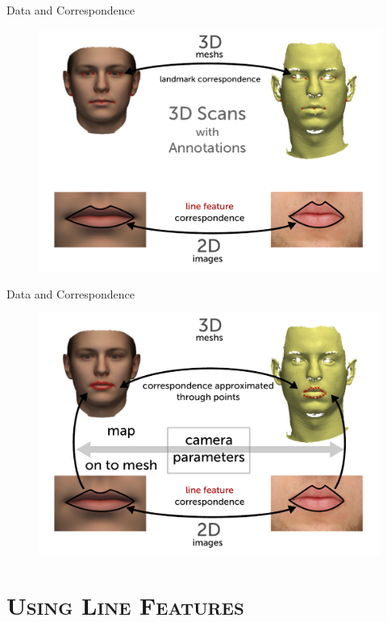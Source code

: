\documentclass[xcolor=x11names,compress]{beamer}
\begin{document}
    \begin{frame}{Data and Correspondence}
        \begin{figure}
            \includegraphics[width=.9\textwidth]{../resources/figures/givendata2.pdf}
        \end{figure}
    \end{frame}

    \begin{frame}{Data and Correspondence}
        \begin{figure}
            \includegraphics[width=.9\textwidth]{../resources/figures/givendata3.pdf}
        \end{figure}
    \end{frame}

    \section{\scshape Using Line Features}
\end{document}
